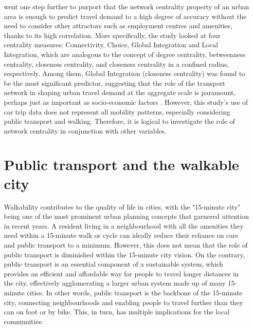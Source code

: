 \citet{jayasingheApplicationDevelopingCountries2017} went one step further to purport that the network centrality property of an urban area is enough to predict travel demand to a high degree of accuracy without the need to consider other attractors such as employment centres and amenities, thanks to its high correlation. More specifically, the study looked at four centrality measures: Connectivity, Choice, Global Integration and Local Integration, which are analogous to the concept of degree centrality, betweenness centrality, closeness centrality, and closeness centrality in a confined radius, respectively. Among them, Global Integration (closeness centrality) was found to be the most significant predictor, suggesting that the role of the transport network in shaping urban travel demand at the aggregate scale is paramount, perhaps just as important as socio-economic factors \citep{converyDeterminantsTransportMode2019}. However, this study's use of car trip data does not represent all mobility patterns, especially considering public transport and walking. Therefore, it is logical to investigate the role of network centrality in conjunction with other variables.

\section{Public transport and the walkable city}

Walkability contributes to the quality of life in cities, with the "15-minute city" being one of the most prominent urban planning concepts that garnered attention in recent years. A resident living in a neighbourhood with all the amenities they need within a 15-minute walk or cycle can ideally reduce their reliance on cars and public transport to a minimum. However, this does not mean that the role of public transport is diminished within the 15-minute city vision. On the contrary, public transport is an essential component of a sustainable system, which provides an efficient and affordable way for people to travel longer distances in the city, effectively agglomerating a larger urban system made up of many 15-minute cities. In other words, public transport is the backbone of the 15-minute city, connecting neighbourhoods and enabling people to travel further than they can on foot or by bike. This, in turn, has multiple implications for the local communities:

